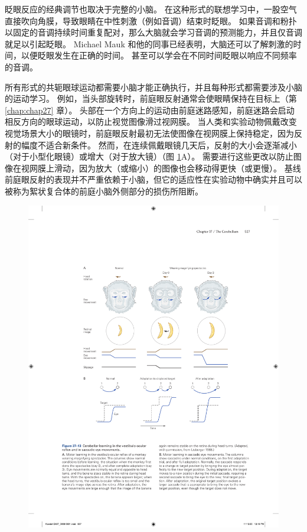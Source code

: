眨眼反应的经典调节也取决于完整的小脑。 在这种形式的联想学习中，一股空气直接吹向角膜，导致眼睛在中性刺激（例如音调）结束时眨眼。 如果音调和粉扑以固定的音调持续时间重复配对，那么大脑就会学习音调的预测能力，并且仅音调就足以引起眨眼。 Michael Mauk 和他的同事已经表明，大脑还可以了解刺激的时间，以便眨眼发生在正确的时间。 甚至可以学会在不同时间眨眼以响应不同频率的音调。

所有形式的共轭眼球运动都需要小脑才能正确执行，并且每种形式都需要涉及小脑的运动学习。 例如，当头部旋转时，前庭眼反射通常会使眼睛保持在目标上（第 \ref{chap:chap27} 章）。 头部在一个方向上的运动由前庭迷路感知，前庭迷路会启动相反方向的眼球运动，以防止视觉图像滑过视网膜。 当人类和实验动物佩戴改变视觉场景大小的眼镜时，前庭眼反射最初无法使图像在视网膜上保持稳定，因为反射的幅度不适合新条件。 
然而，在连续佩戴眼镜几天后，反射的大小会逐渐减小（对于小型化眼镜）或增大（对于放大镜）（图 \ref{fig:37_13}A）。 
需要进行这些更改以防止图像在视网膜上滑动，因为放大（或缩小）的图像也会移动得更快（或更慢）。 基线前庭眼反射的表现并不严重依赖于小脑，但它的适应性在实验动物中确实并且可以被称为絮状复合体的前庭小脑外侧部分的损伤所阻断。

\begin{figure}[htbp]
	\centering
	\includegraphics[width=0.8\linewidth]{chap37/fig_37_13}
	\caption{}
	\label{fig:37_13}
\end{figure}

